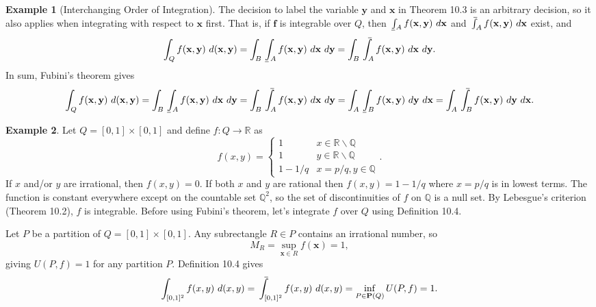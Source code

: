 \documentclass{article}
\def\upint{\mathchoice%
	{\mkern13mu\overline{\vphantom{\intop}\mkern7mu}\mkern-20mu}%
	{\mkern7mu\overline{\vphantom{\intop}\mkern7mu}\mkern-14mu}%
	{\mkern7mu\overline{\vphantom{\intop}\mkern7mu}\mkern-14mu}%
	{\mkern7mu\overline{\vphantom{\intop}\mkern7mu}\mkern-14mu}%
	\int}
\def\lowint{\mkern3mu\underline{\vphantom{\intop}\mkern7mu}\mkern-10mu\int}
\newcommand{\R}{\mathbb{R}}
\newcommand{\Q}{\mathbb{Q}}
\newcommand{\x}{\mathbf{x}}
\newcommand{\f}{\mathbf{f}}
\newcommand{\y}{\mathbf{y}}
\theoremstyle{definition}
\newtheorem{example}{Example}[section]
\begin{document}
\begin{example}[Interchanging Order of Integration]
	The decision to label the variable $ \y $ and $ \x $ in Theorem 10.3 is an arbitrary decision, so it also applies when integrating with respect to $ \x $ first. That is, if $ \f $ is integrable over $ Q $, then $ \lowint_A f(\x,\y)\ d\x $ and $ \upint_A f(\x,\y)\ d\x $ exist, and 
	$$ \int_Q f(\x,\y)\ d(\x,\y) = \int_{B}\lowint_Af(\x,\y)\ d\x\ d\y = \int_{B}\upint_Af(\x,\y)\ d\x\ d\y .$$ 
	In sum, Fubini's theorem gives 
	$$  \int_Q f(\x,\y)\ d(\x,\y) = \int_{B}\lowint_Af(\x,\y)\ d\x\ d\y = \int_{B}\upint_Af(\x,\y)\ d\x\ d\y =  \int_{A}\lowint_Bf(\x,\y)\ d\y\ d\x = \int_{A}\upint_Bf(\x,\y)\ d\y\ d\x.$$ 
\end{example}
 \begin{example}
 	Let $ Q = [0,1]\times [0,1] $ and define $ f:Q\to \R $ as $$f(x,y)=\begin{cases}
 		1 & x\in \R\backslash\Q\\
 		1 & y\in \R\backslash\Q \\ 
 		1-1/q & x = p/q, y\in \Q 
 	\end{cases} .$$ If $ x $ and/or $ y $ are irrational, then $ f(x,y)=0 $. If both $ x $ and $ y $ are rational then $ f(x,y)=1-1/q $ where $ x = p/q $ is in lowest terms. The function is constant everywhere except on the countable set $ \Q^2 $, so the set of discontinuities of $ f $ on $ \Q $ is a null set. By Lebesgue's criterion (Theorem 10.2), $ f $ is integrable. Before using Fubini's theorem, let's integrate $ f $ over $ Q $ using Definition 10.4.
 	
 	Let $ P $ be a partition of $ Q=[0,1]\times [0,1] $. Any subrectangle $ R\in P $ contains an irrational number, so 
 	$$ M_R = \sup_{\x\in R}f(\x) = 1,$$
 	giving $ U(P,f)=1 $ for any partition $ P $. Definition 10.4 gives 
 	\begin{align*}
 		\int_{[0,1]^2}f(x,y) \ d(x,y)  = \upint_{[0,1]^2} f(x,y)\ d(x,y)= \inf_{P\in \textbf{P}(Q)} U(P,f)  = 1.
 	\end{align*}
 	

\end{example}
\end{document}
